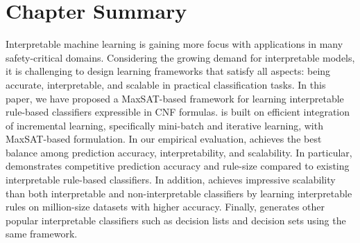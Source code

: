 
\section{Chapter Summary}
\label{interpretability_imli_sec:conclusion}
Interpretable machine learning is gaining more focus with applications in many safety-critical domains. Considering the growing demand for interpretable models, it is challenging to design learning frameworks that satisfy all aspects: being accurate, interpretable, and scalable in practical classification tasks.  In this paper, we have proposed a MaxSAT-based framework {\imli} for learning interpretable rule-based classifiers expressible in CNF formulas. {\imli} is built on efficient integration of incremental learning, specifically mini-batch and iterative learning, with MaxSAT-based formulation.  In our empirical evaluation, {\imli} achieves the best balance among prediction accuracy, interpretability, and scalability. In particular, {\imli} demonstrates competitive prediction accuracy and rule-size compared to existing interpretable rule-based classifiers. In addition, {\imli} achieves impressive scalability than both interpretable and non-interpretable classifiers by learning interpretable rules on million-size datasets with higher accuracy.  Finally, {\imli}  generates other popular interpretable classifiers such as decision lists and decision sets using the same framework.


